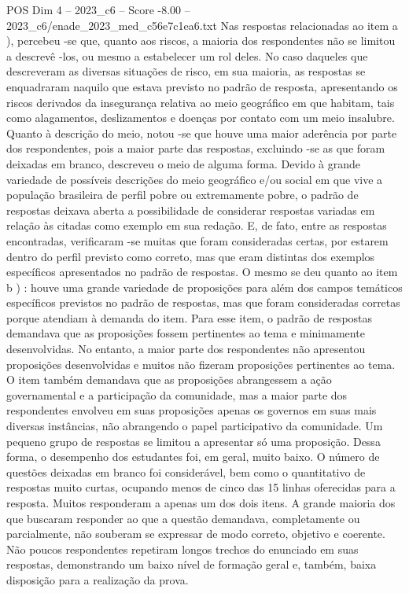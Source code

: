 \begin{textsample}{POS Dim 4 – 2023\_c6 – Score -8.00 – 2023\_c6/enade\_2023\_med\_c56e7c1ea6.txt}
Nas respostas relacionadas ao item a ), percebeu -se que, quanto aos riscos, a maioria dos respondentes não se limitou a descrevê -los, ou mesmo a estabelecer um rol deles.
No caso daqueles que descreveram as diversas situações de risco, em sua maioria, as respostas se enquadraram naquilo que estava previsto no padrão de resposta, apresentando os riscos derivados da insegurança relativa ao meio geográfico em que habitam, tais como alagamentos, deslizamentos e doenças por contato com um meio insalubre.
Quanto à descrição do meio, notou -se que houve uma maior aderência por parte dos respondentes, pois a maior parte das respostas, excluindo -se as que foram deixadas em branco, descreveu o meio de alguma forma.
Devido à grande variedade de possíveis descrições do meio geográfico e/ou social em que vive a população brasileira de perfil pobre ou extremamente pobre, o padrão de respostas deixava aberta a possibilidade de considerar respostas variadas em relação às citadas como exemplo em sua redação.
E, de fato, entre as respostas encontradas, verificaram -se muitas que foram consideradas certas, por estarem dentro do perfil previsto como correto, mas que eram distintas dos exemplos específicos apresentados no padrão de respostas.
O mesmo se deu quanto ao item b ) : houve uma grande variedade de proposições para além dos campos temáticos específicos previstos no padrão de respostas, mas que foram consideradas corretas porque atendiam à demanda do item.
Para esse item, o padrão de respostas demandava que as proposições fossem pertinentes ao tema e minimamente desenvolvidas.
No entanto, a maior parte dos respondentes não apresentou proposições desenvolvidas e muitos não fizeram proposições pertinentes ao tema.
O item também demandava que as proposições abrangessem a ação governamental e a participação da comunidade, mas a maior parte dos respondentes envolveu em suas proposições apenas os governos em suas mais diversas instâncias, não abrangendo o papel participativo da comunidade.
Um pequeno grupo de respostas se limitou a apresentar só uma proposição.
Dessa forma, o desempenho dos estudantes foi, em geral, muito baixo.
O número de questões deixadas em branco foi considerável, bem como o quantitativo de respostas muito curtas, ocupando menos de cinco das 15 linhas oferecidas para a resposta.
Muitos responderam a apenas um dos dois itens.
A grande maioria dos que buscaram responder ao que a questão demandava, completamente ou parcialmente, não souberam se expressar de modo correto, objetivo e coerente.
Não poucos respondentes repetiram longos trechos do enunciado em suas respostas, demonstrando um baixo nível de formação geral e, também, baixa disposição para a realização da prova.

\end{textsample}
